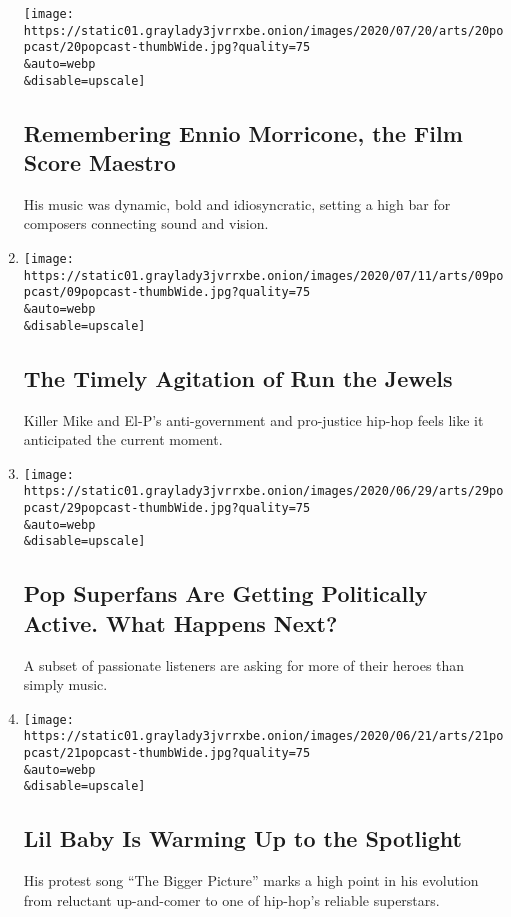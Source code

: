 \begin{enumerate}
  \texttt{[image: https://static01.graylady3jvrrxbe.onion/images/2020/07/20/arts/20popcast/20popcast-thumbWide.jpg?quality=75\\\&auto=webp\\\&disable=upscale]}

  \hypertarget{remembering-ennio-morricone-the-film-score-maestro}{%
  \subsection{Remembering Ennio Morricone, the Film Score
  Maestro}\label{remembering-ennio-morricone-the-film-score-maestro}}

  His music was dynamic, bold and idiosyncratic, setting a high bar for
  composers connecting sound and vision.
\item
  \href{/2020/07/09/arts/music/popcast-run-the-jewels.html}{}

  \texttt{[image: https://static01.graylady3jvrrxbe.onion/images/2020/07/11/arts/09popcast/09popcast-thumbWide.jpg?quality=75\\\&auto=webp\\\&disable=upscale]}

  \hypertarget{the-timely-agitation-of-run-the-jewels}{%
  \subsection{The Timely Agitation of Run the
  Jewels}\label{the-timely-agitation-of-run-the-jewels}}

  Killer Mike and El-P's anti-government and pro-justice hip-hop feels
  like it anticipated the current moment.
\item
  \href{/2020/06/30/arts/music/popcast-superfans-politics.html}{}

  \texttt{[image: https://static01.graylady3jvrrxbe.onion/images/2020/06/29/arts/29popcast/29popcast-thumbWide.jpg?quality=75\\\&auto=webp\\\&disable=upscale]}

  \hypertarget{pop-superfans-are-getting-politically-active-what-happens-next}{%
  \subsection{Pop Superfans Are Getting Politically Active. What Happens
  Next?}\label{pop-superfans-are-getting-politically-active-what-happens-next}}

  A subset of passionate listeners are asking for more of their heroes
  than simply music.
\item
  \href{/2020/06/21/arts/music/popcast-lil-baby.html}{}

  \texttt{[image: https://static01.graylady3jvrrxbe.onion/images/2020/06/21/arts/21popcast/21popcast-thumbWide.jpg?quality=75\\\&auto=webp\\\&disable=upscale]}

  \hypertarget{lil-baby-is-warming-up-to-the-spotlight}{%
  \subsection{Lil Baby Is Warming Up to the
  Spotlight}\label{lil-baby-is-warming-up-to-the-spotlight}}

  His protest song ``The Bigger Picture'' marks a high point in his
  evolution from reluctant up-and-comer to one of hip-hop's reliable
  superstars.
\end{enumerate}

